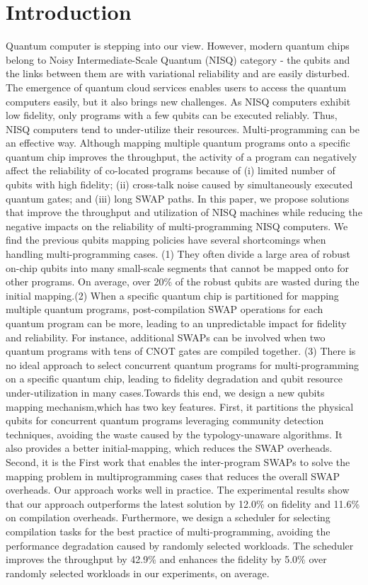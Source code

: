 \documentclass[10pt,twocolumn]{article}
\begin{document}
	\section{Introduction}
	Quantum computer is stepping into our view. However, modern
	quantum chips belong to Noisy Intermediate-Scale Quantum (NISQ) category \cite{preskill2018} - the qubits and the links between them are with variational reliability and are easily disturbed. The emergence of quantum cloud services enables users to access the quantum computers easily, but it also brings new challenges. As NISQ computers exhibit low fidelity, only programs with a few qubits can be executed reliably. Thus, NISQ computers tend to under-utilize their
	resources. Multi-programming can be an effective way. Although mapping multiple quantum programs onto a specific quantum chip improves the throughput, the activity of a program can negatively affect the reliability of co-located programs because of (i) limited number of qubits with high fidelity; (ii) cross-talk noise caused by simultaneously executed quantum gates; and (iii) long SWAP paths. In this paper, we propose solutions that improve the throughput
	and utilization of NISQ machines while reducing the negative impacts on the reliability of multi-programming NISQ computers. We find the previous qubits mapping policies have several shortcomings when handling multi-programming cases. (1) They often divide a large area of robust on-chip qubits into many small-scale segments that cannot be mapped onto for other programs. On average, over 20\% of the robust qubits are wasted during the initial mapping.(2) When a specific quantum chip is partitioned for mapping multiple quantum programs, post-compilation SWAP operations for
	each quantum program can be more, leading to an unpredictable
	impact for fidelity and reliability. For instance, additional SWAPs can be involved when two quantum programs with tens of CNOT gates are compiled together. (3) There is no ideal approach to select concurrent quantum programs for multi-programming on a specific quantum chip, leading to fidelity degradation and qubit resource
	under-utilization in many cases.Towards this end, we design a new qubits mapping mechanism,which has two key features. First, it partitions the physical qubits for concurrent quantum programs leveraging community detection techniques, avoiding the waste caused by the typology-unaware algorithms. It also provides a better initial-mapping, which reduces the SWAP overheads. Second, it is the First work that enables the inter-program SWAPs to solve the mapping problem in multiprogramming cases that reduces the overall SWAP overheads. Our approach works well in practice. The experimental results show that our approach outperforms the latest solution \cite{das2019} by 12.0\% on fidelity and 11.6\% on compilation overheads. Furthermore, we design a scheduler for selecting compilation tasks for the best practice of multi-programming, avoiding the performance degradation caused by randomly selected workloads. The scheduler improves
	the throughput by 42.9\% and enhances the fidelity by 5.0\% over
	randomly selected workloads in our experiments, on average.
\end{document}
